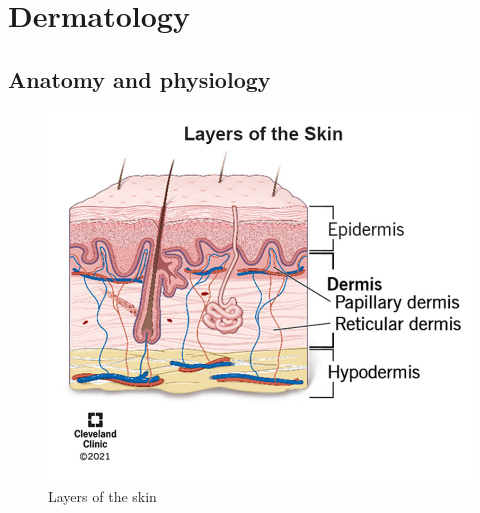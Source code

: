 \documentclass[
  12pt,
]{memoir}
\begin{document}
\pagebreak

\hypertarget{dermatology}{%
\chapter{Dermatology}\label{dermatology}}

\hypertarget{anatomy-and-physiology-1}{%
\section{Anatomy and physiology}\label{anatomy-and-physiology-1}}

\begin{figure}
    \centering
    \includegraphics[width=.5\textwidth]{../assets/surg/skin-layers.jpg}
    \caption{Layers of the skin}
\end{figure}
\end{document}
